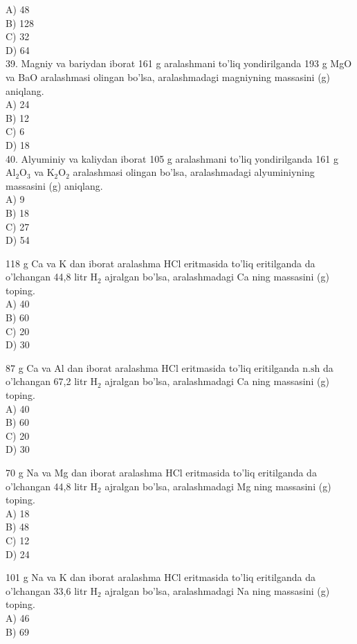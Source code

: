 A) 48\\
B) 128\\
C) 32\\
D) 64\\
39. Magniy va bariydan iborat 161 g aralashmani to'liq yondirilganda 193 g MgO va BaO aralashmasi olingan bo'lsa, aralashmadagi magniyning massasini (g) aniqlang.\\
A) 24\\
B) 12\\
C) 6\\
D) 18\\
40. Alyuminiy va kaliydan iborat 105 g aralashmani to'liq yondirilganda 161 g $\mathrm{Al}_{2} \mathrm{O}_{3}$ va $\mathrm{K}_{2} \mathrm{O}_{2}$ aralashmasi olingan bo'lsa, aralashmadagi alyuminiyning massasini (g) aniqlang.\\
A) 9\\
B) 18\\
C) 27\\
D) 54
  \item 118 g Ca va K dan iborat aralashma HCl eritmasida to'liq eritilganda da o'lchangan 44,8 litr $\mathrm{H}_{2}$ ajralgan bo'lsa, aralashmadagi Ca ning massasini (g) toping.\\
A) 40\\
B) 60\\
C) 20\\
D) 30
  \item 87 g Ca va Al dan iborat aralashma HCl eritmasida to'liq eritilganda $\mathrm{n} . \mathrm{sh}$ da o'lchangan 67,2 litr $\mathrm{H}_{2}$ ajralgan bo'lsa, aralashmadagi Ca ning massasini (g) toping.\\
A) 40\\
B) 60\\
C) 20\\
D) 30
  \item 70 g Na va Mg dan iborat aralashma HCl eritmasida to'liq eritilganda da o'lchangan 44,8 litr $\mathrm{H}_{2}$ ajralgan bo'lsa, aralashmadagi Mg ning massasini (g) toping.\\
A) 18\\
B) 48\\
C) 12\\
D) 24
  \item 101 g Na va K dan iborat aralashma HCl eritmasida to'liq eritilganda da o'lchangan 33,6 litr $\mathrm{H}_{2}$ ajralgan bo'lsa, aralashmadagi Na ning massasini (g) toping.\\
A) 46\\
B) 69\\
